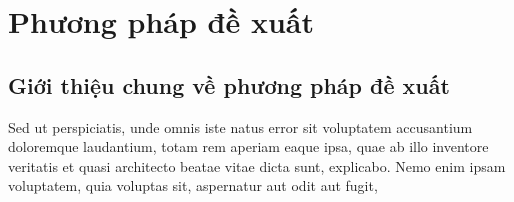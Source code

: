 
\chapter{Phương pháp đề xuất}
\label{chap:attrel}

\section{Giới thiệu chung về phương pháp đề xuất}

Sed ut perspiciatis, unde omnis iste natus error sit voluptatem accusantium doloremque laudantium, totam rem aperiam eaque ipsa, quae ab illo inventore veritatis et quasi architecto beatae vitae dicta sunt, explicabo. Nemo enim ipsam voluptatem, quia voluptas sit, aspernatur aut odit aut fugit, 